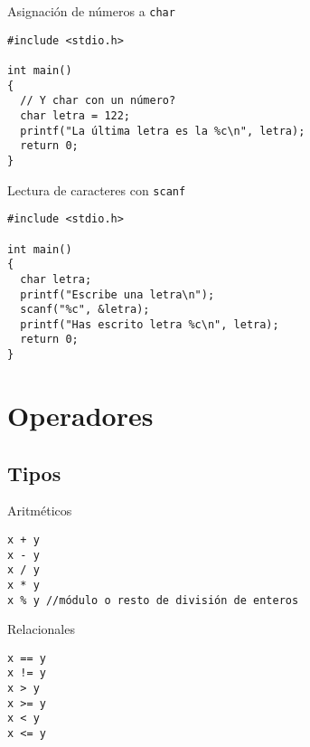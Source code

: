 \documentclass[xcolor={usenames,svgnames,dvipsnames}, aspectratio=169]{beamer}
\begin{document}
\begin{frame}[label={sec:org905fcd9},fragile]{Asignación de números a \texttt{char}}
 \lstset{language=C,label= ,caption= ,captionpos=b,numbers=none}
\begin{lstlisting}
#include <stdio.h>

int main()
{
  // Y char con un número?
  char letra = 122;
  printf("La última letra es la %c\n", letra);
  return 0;
}
\end{lstlisting}
\end{frame}

\begin{frame}[label={sec:org1f8f864},fragile]{Lectura de caracteres con \texttt{scanf}}
 \lstset{language=C,label= ,caption= ,captionpos=b,numbers=none}
\begin{lstlisting}
#include <stdio.h>

int main()
{
  char letra;
  printf("Escribe una letra\n");
  scanf("%c", &letra);
  printf("Has escrito letra %c\n", letra);
  return 0;
}
\end{lstlisting}
\end{frame}

\section{Operadores}
\label{sec:org241de9a}
\subsection{Tipos}
\label{sec:org9360882}
\begin{frame}[label={sec:org05d078f},fragile]{Aritméticos}
 \lstset{language=C,label= ,caption= ,captionpos=b,numbers=none}
\begin{lstlisting}
x + y
x - y
x / y
x * y
x % y //módulo o resto de división de enteros
\end{lstlisting}
\end{frame}
\begin{frame}[label={sec:org3e1c0ea},fragile]{Relacionales}
 \lstset{language=C,label= ,caption= ,captionpos=b,numbers=none}
\begin{lstlisting}
x == y
x != y
x > y
x >= y
x < y
x <= y
\end{lstlisting}
\end{frame}
\end{document}
